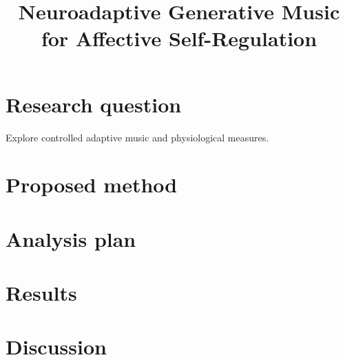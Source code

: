 \documentclass[11pt]{article}
\title{Neuroadaptive Generative Music for Affective Self-Regulation}
\date{}
\begin{document}
\maketitle
\section{Research question}
Explore controlled adaptive music and physiological measures.
\section{Proposed method}
\section{Analysis plan}
\section{Results}
\section{Discussion}
\end{document}
